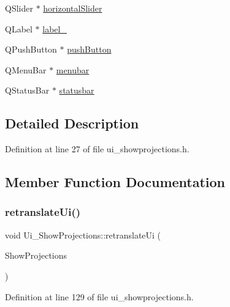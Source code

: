 \begin{DoxyCompactItemize}
\item 
Q\+Slider $\ast$ \mbox{\hyperlink{class_ui___show_projections_ac1a03d79b45fe20a1d099d310c9a213f}{horizontal\+Slider}}
\item 
Q\+Label $\ast$ \mbox{\hyperlink{class_ui___show_projections_abac277a86977023e4267d72659dcf7bb}{label\+\_}}
\item 
Q\+Push\+Button $\ast$ \mbox{\hyperlink{class_ui___show_projections_af4f0f60b410c32d69ac1632be0c73e45}{push\+Button}}
\item 
Q\+Menu\+Bar $\ast$ \mbox{\hyperlink{class_ui___show_projections_a7ca4f4e07d9e7c980fdac837512efbc1}{menubar}}
\item 
Q\+Status\+Bar $\ast$ \mbox{\hyperlink{class_ui___show_projections_a079e59fb8a5ecf2349753b0044767c94}{statusbar}}
\end{DoxyCompactItemize}


\subsection{Detailed Description}


Definition at line 27 of file ui\+\_\+showprojections.\+h.



\subsection{Member Function Documentation}
\mbox{\label{class_ui___show_projections_aa43b9e0a80ae6ac1dd3c4ed5fdae1148}} 
\subsubsection{\texorpdfstring{retranslate\+Ui()}{retranslateUi()}}
{\footnotesize\ttfamily void Ui\+\_\+\+Show\+Projections\+::retranslate\+Ui (\begin{DoxyParamCaption}\item[{Q\+Main\+Window $\ast$}]{Show\+Projections }\end{DoxyParamCaption})\hspace{0.3cm}{\ttfamily [inline]}}



Definition at line 129 of file ui\+\_\+showprojections.\+h.

